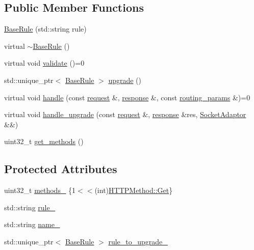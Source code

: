 \subsection*{Public Member Functions}
\begin{DoxyCompactItemize}
\item 
\hyperlink{classcrow_1_1_base_rule_ada4c61f94eb32ebbb5d553cacbc83013}{Base\-Rule} (std\-::string rule)
\item 
virtual \hyperlink{classcrow_1_1_base_rule_a270efe3d144ed2cc638e78758d08b0d8}{$\sim$\-Base\-Rule} ()
\item 
virtual void \hyperlink{classcrow_1_1_base_rule_a895d85332340788206cee0b1555ac8c2}{validate} ()=0
\item 
std\-::unique\-\_\-ptr$<$ \hyperlink{classcrow_1_1_base_rule}{Base\-Rule} $>$ \hyperlink{classcrow_1_1_base_rule_a9f71a6cab50c4ff480785c4be86d596e}{upgrade} ()
\item 
virtual void \hyperlink{classcrow_1_1_base_rule_ac8cad63944971ba3ee77b4091cf88a02}{handle} (const \hyperlink{structcrow_1_1request}{request} \&, \hyperlink{structcrow_1_1response}{response} \&, const \hyperlink{structcrow_1_1routing__params}{routing\-\_\-params} \&)=0
\item 
virtual void \hyperlink{classcrow_1_1_base_rule_acf37339742cfca68b60b9d872382a43d}{handle\-\_\-upgrade} (const \hyperlink{structcrow_1_1request}{request} \&, \hyperlink{structcrow_1_1response}{response} \&res, \hyperlink{structcrow_1_1_socket_adaptor}{Socket\-Adaptor} \&\&)
\item 
uint32\-\_\-t \hyperlink{classcrow_1_1_base_rule_aba0284ef74a04b9c2401b3a5022f57a6}{get\-\_\-methods} ()
\end{DoxyCompactItemize}
\subsection*{Protected Attributes}
\begin{DoxyCompactItemize}
\item 
uint32\-\_\-t \hyperlink{classcrow_1_1_base_rule_a997e9942d597fe133df84c94558c1e13}{methods\-\_\-} \{1$<$$<$(int)\hyperlink{namespacecrow_a02d34072d2b3415aee5e7287edd06ae1ac55582518cba2c464f29f5bae1c68def}{H\-T\-T\-P\-Method\-::\-Get}\}
\item 
std\-::string \hyperlink{classcrow_1_1_base_rule_a39f73fef34a8ff67907d96ef9c92b35a}{rule\-\_\-}
\item 
std\-::string \hyperlink{classcrow_1_1_base_rule_a34d579887fac170e179e9e69eac3d771}{name\-\_\-}
\item 
std\-::unique\-\_\-ptr$<$ \hyperlink{classcrow_1_1_base_rule}{Base\-Rule} $>$ \hyperlink{classcrow_1_1_base_rule_aa08be2b793fe80d462f71c064a9949b8}{rule\-\_\-to\-\_\-upgrade\-\_\-}
\end{DoxyCompactItemize}
